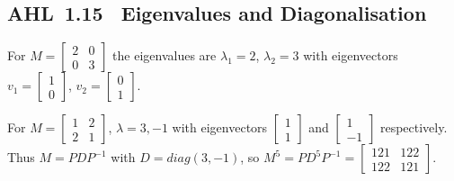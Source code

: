 \documentclass[11pt]{article}
\def\mathbf#1{#1}%
\def\mathrm#1{#1}%
\newcommand{\tocsubsection}[1]{\subsection{#1}}
\begin{document}
\tocsubsection{AHL 1.15 \; Eigenvalues and Diagonalisation}

\begin{solution}
For $M=\begin{bmatrix}2&0\\0&3\end{bmatrix}$ the eigenvalues are $\lambda_1=2$, $\lambda_2=3$ with eigenvectors $\mathbf{v}_1=\begin{bmatrix}1\\0\end{bmatrix}$, $\mathbf{v}_2=\begin{bmatrix}0\\1\end{bmatrix}$.
\end{solution}

\begin{solution}
For $M=\begin{bmatrix}1&2\\2&1\end{bmatrix}$, $\lambda=3,-1$ with eigenvectors $\begin{bmatrix}1\\1\end{bmatrix}$ and $\begin{bmatrix}1\\-1\end{bmatrix}$ respectively.
Thus $M=PDP^{-1}$ with $D=\mathrm{diag}(3,-1)$, so $M^5=PD^5P^{-1}=\begin{bmatrix}121&122\\122&121\end{bmatrix}$.
\end{solution}

\end{document}
